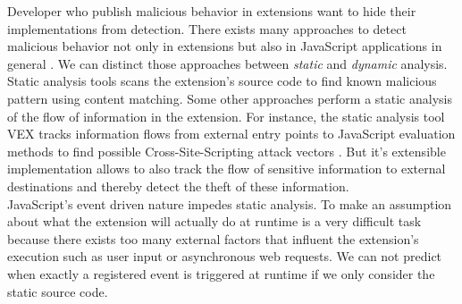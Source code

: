 	Developer who publish malicious behavior in extensions want to hide their implementations from detection. There exists many approaches to detect malicious behavior not only in extensions but also in JavaScript applications in general \cite{184485, 190984, Bandhakavi:2011:VBE:1995376.1995398, Dhawan:2009:AIF:1723192.1723250, Hallaraker:2005:DMJ:1078029.1078861, kim2011suspicious}. We can distinct those approaches between \textit{static} and \textit{dynamic} analysis. \\
	
	Static analysis tools scans the extension's source code to find known malicious pattern using content matching. Some other approaches perform a static analysis of the flow of information in the extension. For instance, the static analysis tool VEX tracks information flows from external entry points to JavaScript evaluation methods to find possible Cross-Site-Scripting attack vectors \cite{Bandhakavi:2011:VBE:1995376.1995398}. But it's extensible implementation allows to also track the flow of sensitive information to external destinations and thereby detect the theft of these information. \\ %
	JavaScript's event driven nature impedes static analysis. To make an assumption about what the extension will actually do at runtime is a very difficult task because there exists too many external factors that influent the extension's execution such as user input or asynchronous web requests. We can not predict when exactly a registered event is triggered at runtime if we only consider the static source code. \\
	
